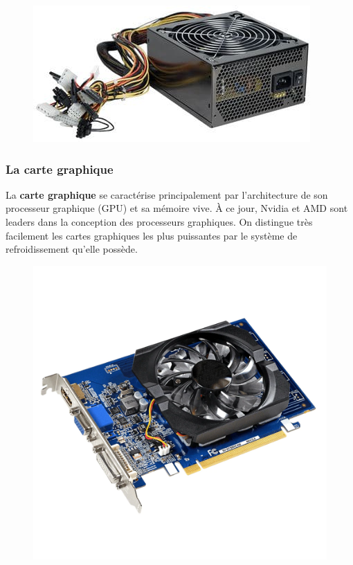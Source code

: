 \documentclass[11pt, a4paper]{book}
\begin{document}
\begin{figure}[h]
	\centering
	\includegraphics[scale=.5]{images/alimentation}

\end{figure}

\subsubsection{La carte graphique}

	La {\bf carte graphique} se caractérise principalement par l'architecture de son processeur graphique (GPU) et sa mémoire vive. À ce jour, Nvidia et AMD sont leaders dans la conception des processeurs graphiques. On distingue très facilement les cartes graphiques les plus puissantes par le système de refroidissement qu’elle possède.
	
	\begin{figure}[h]
	\centering
	\includegraphics[scale=.2]{images/carte_graphique}

\end{figure}
\end{document}
